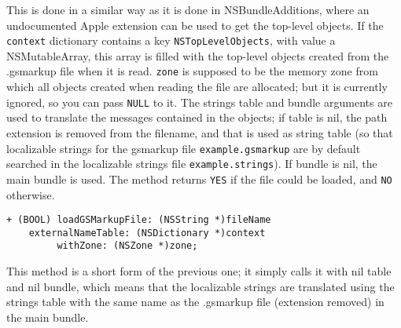 This is done in a similar way as it is done in NSBundleAdditions,
where an undocumented Apple extension can be used to get the top-level
objects.  If the \texttt{context} dictionary contains a key
\texttt{NSTopLevelObjects}, with value a NSMutableArray, this array is
filled with the top-level objects created from the .gsmarkup file when it
is read.  \texttt{zone} is supposed to be the memory zone from which
all objects created when reading the file are allocated; but it is
currently ignored, so you can pass \texttt{NULL} to it.  The strings
table and bundle arguments are used to translate the messages
contained in the objects; if table is nil, the path extension is
removed from the filename, and that is used as string table (so that
localizable strings for the gsmarkup file \texttt{example.gsmarkup} are by
default searched in the localizable strings file
\texttt{example.strings}).  If bundle is nil, the main bundle is used.
The method returns \texttt{YES} if the file could be loaded, and
\texttt{NO} otherwise.

\begin{verbatim}
+ (BOOL) loadGSMarkupFile: (NSString *)fileName
    externalNameTable: (NSDictionary *)context
	     withZone: (NSZone *)zone;
\end{verbatim}
This method is a short form of the previous one; it simply calls it
with nil table and nil bundle, which means that the localizable
strings are translated using the strings table with the same name as
the .gsmarkup file (extension removed) in the main bundle.

